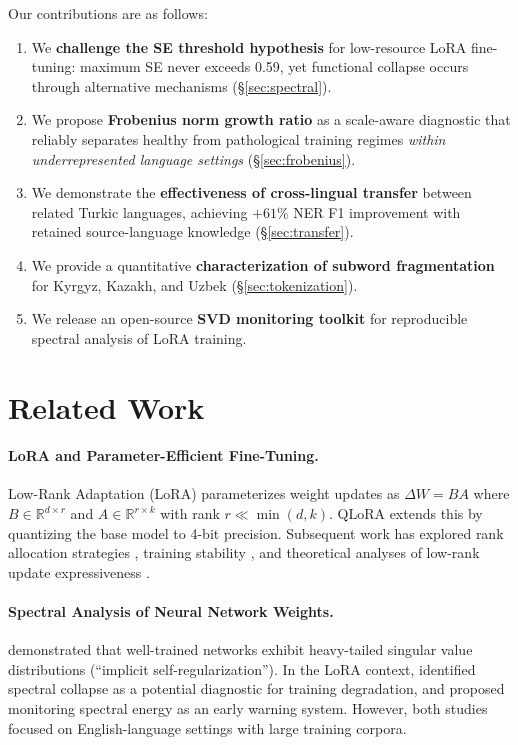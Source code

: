 \documentclass[11pt]{article}
\begin{document}
Our contributions are as follows:
\begin{enumerate}
    \item We \textbf{challenge the SE threshold hypothesis} for low-resource LoRA fine-tuning: maximum SE never exceeds 0.59, yet functional collapse occurs through alternative mechanisms (\S\ref{sec:spectral}).
    \item We propose \textbf{Frobenius norm growth ratio} as a scale-aware diagnostic that reliably separates healthy from pathological training regimes \emph{within underrepresented language settings} (\S\ref{sec:frobenius}).
    \item We demonstrate the \textbf{effectiveness of cross-lingual transfer} between related Turkic languages, achieving $+61\%$ NER F1 improvement with retained source-language knowledge (\S\ref{sec:transfer}).
    \item We provide a quantitative \textbf{characterization of subword fragmentation} for Kyrgyz, Kazakh, and Uzbek (\S\ref{sec:tokenization}).
    \item We release an open-source \textbf{SVD monitoring toolkit} for reproducible spectral analysis of LoRA training.
\end{enumerate}

\section{Related Work}

\paragraph{LoRA and Parameter-Efficient Fine-Tuning.}
Low-Rank Adaptation (LoRA) \cite{hu2022lora} parameterizes weight updates as $\Delta W = BA$ where $B \in \mathbb{R}^{d \times r}$ and $A \in \mathbb{R}^{r \times k}$ with rank $r \ll \min(d, k)$. QLoRA \cite{dettmers2023qlora} extends this by quantizing the base model to 4-bit precision. Subsequent work has explored rank allocation strategies \cite{zhang2023adalora}, training stability \cite{lialin2023relora}, and theoretical analyses of low-rank update expressiveness \cite{malladi2023kernel}.

\paragraph{Spectral Analysis of Neural Network Weights.}
\citet{martin2021implicit} demonstrated that well-trained networks exhibit heavy-tailed singular value distributions (``implicit self-regularization''). In the LoRA context, \citet{biderman2024lora} identified spectral collapse as a potential diagnostic for training degradation, and \citet{jang2024lora} proposed monitoring spectral energy as an early warning system. However, both studies focused on English-language settings with large training corpora.
\end{document}
